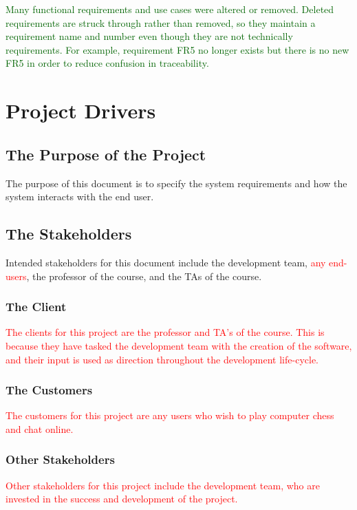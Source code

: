 \documentclass[12pt, titlepage]{article}
\begin{document}
     \textcolor{darkgreen}{Many functional requirements and use cases were altered or removed. Deleted requirements are struck through rather than removed, so they maintain a requirement name and number even though they are not technically requirements. For example, requirement FR5 no longer exists but there is no new FR5 in order to reduce confusion in traceability.}
    
\section{Project Drivers}

    \subsection{The Purpose of the Project}
        The purpose of this document is to specify the system requirements and how the system interacts with the end user.

    \subsection{The Stakeholders}
        Intended stakeholders for this document include the development team, \textcolor{red}{any end-users}, the professor of the course, and the TAs of the course.
    
        \subsubsection{The Client}
            \textcolor{red}{The clients for this project are the professor and TA's of the course. This is because they have tasked the development team with the creation of the software, and their input is used as direction throughout the development life-cycle.}
            
        \subsubsection{The Customers}
            \textcolor{red}{The customers for this project are any users who wish to play computer chess and chat online.}
            
        \subsubsection{Other Stakeholders}
            \textcolor{red}{Other stakeholders for this project include the development team, who are invested in the success and development of the project.}
        
\end{document}
